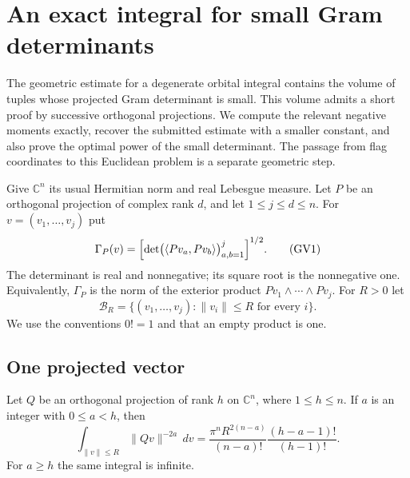 \section{An exact integral for small Gram determinants}
\label{gv-section}

The geometric estimate for a degenerate orbital integral contains
the volume of tuples whose projected Gram determinant is small.
This volume admits a short proof by successive orthogonal projections.
We compute the relevant negative moments exactly, recover the submitted
estimate with a smaller constant, and also prove the optimal power
of the small determinant.  The passage from flag coordinates to this
Euclidean problem is a separate geometric step.
\cite{alpo-uniform-source}

Give $\mathbb C^n$ its usual Hermitian norm and real Lebesgue measure.
Let $P$ be an orthogonal projection of complex rank $d$, and let
$1\le j\le d\le n$.  For $v=(v_1,\ldots,v_j)$ put
\[
 \Gamma_P(v)=\Bigl[\det\bigl(\langle Pv_a,Pv_b\rangle\bigr)_{a,b=1}^j\Bigr]^{1/2}.
                                                               \tag{GV1}
\]
The determinant is real and nonnegative; its square root is the
nonnegative one.  Equivalently, $\Gamma_P$ is the norm of the
exterior product $Pv_1\wedge\cdots\wedge Pv_j$.  For $R>0$ let
\[
 \mathcal B_R=\{(v_1,\ldots,v_j):\|v_i\|\le R\text{ for every }i\}.
\]
We use the conventions $0!=1$ and that an empty product is one.

\subsection{One projected vector}

\begin{lemma}\label{gv-one-vector}
Let $Q$ be an orthogonal projection of rank $h$ on $\mathbb C^n$,
where $1\le h\le n$.  If $a$ is an integer with $0\le a<h$, then
\[
 \int_{\|v\|\le R}\|Qv\|^{-2a}\,dv
 =\frac{\pi^n R^{2(n-a)}}{(n-a)!}
       \frac{(h-a-1)!}{(h-1)!}.                               \tag{GV2}
\]
For $a\ge h$ the same integral is infinite.
\end{lemma}

